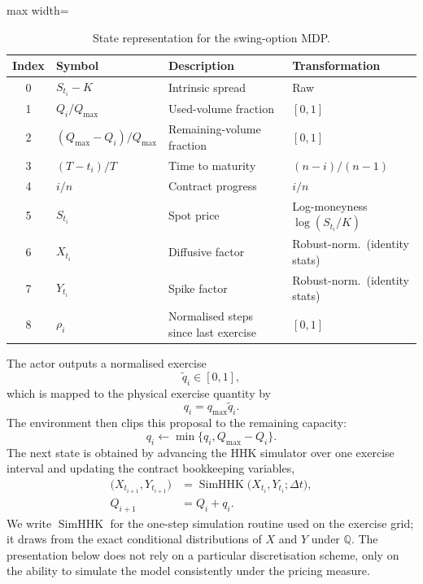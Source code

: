 \documentclass[a4paper,fleqn]{cas-dc}
\begin{document}
\begin{table}[htbp]
    \centering
    \caption{State representation for the swing-option MDP.}
    \label{tab:state_components}
    \begin{adjustbox}{max width=\linewidth}
        \begin{tabular}{clll}
            \toprule
            Index & Symbol                      & Description                          & Transformation                  \\
            \midrule
            0     & $S_{t_i} - K$               & Intrinsic spread                     & Raw                             \\
            1     & $Q_i / Q_{\max}$            & Used-volume fraction                 & $[0,1]$                         \\
            2     & $(Q_{\max} - Q_i)/Q_{\max}$ & Remaining-volume fraction            & $[0,1]$                         \\
            3     & $(T - t_i)/T$               & Time to maturity                     & $(n-i)/(n-1)$                   \\
            4     & $i/n$                       & Contract progress                    & $i/n$                           \\
            5     & $S_{t_i}$                   & Spot price                           & Log-moneyness $\log(S_{t_i}/K)$ \\
            6     & $X_{t_i}$                   & Diffusive factor                     & Robust-norm.\ (identity stats)  \\
            7     & $Y_{t_i}$                   & Spike factor                         & Robust-norm.\ (identity stats)  \\
            8     & $\rho_i$                    & Normalised steps since last exercise & $[0,1]$                         \\
            \bottomrule
        \end{tabular}
    \end{adjustbox}
\end{table}

The actor outputs a normalised exercise
\[
    \tilde{q}_i \in [0,1],
\]
which is mapped to the physical exercise quantity by
\[
    q_i = q_{\max} \tilde{q}_i.
\]
The environment then clips this proposal to the remaining capacity:
\[
    q_i \leftarrow \min\{q_i, Q_{\max} - Q_i\}.
\]
The next state is obtained by advancing the HHK simulator over one exercise interval and updating the contract bookkeeping variables,
\[
    \begin{aligned}
        \bigl(X_{t_{i+1}},Y_{t_{i+1}}\bigr)
                & = \operatorname{SimHHK}\bigl(X_{t_i},Y_{t_i};\Delta t\bigr), \\
        Q_{i+1} & = Q_i + q_i.
    \end{aligned}
\]
We write $\operatorname{SimHHK}$ for the one-step simulation routine used on the exercise grid; it draws from the exact conditional distributions of $X$ and $Y$ under $\mathbb{Q}$. The presentation below does not rely on a particular discretisation scheme, only on the ability to simulate the model consistently under the pricing measure.
\end{document}
